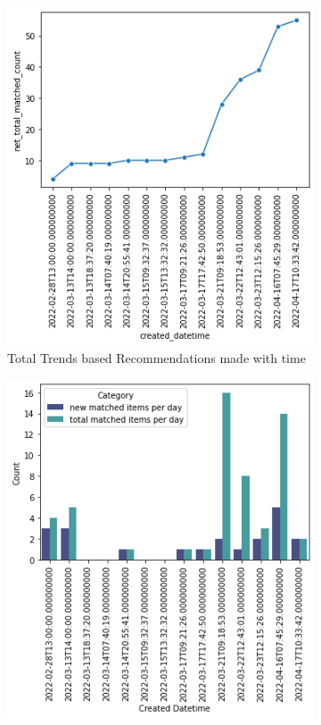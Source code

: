 \documentclass[manuscript,natbib=false, anonymous]{acmart}
\begin{document}
\begin{figure}[h]
     \centering
     \begin{subfigure}[b]{0.47\linewidth}
         \centering
         \includegraphics[width=\linewidth]{images/trends-matches-eval2.png}
         \caption{Total Trends based Recommendations made with time}
         \label{fig:trends-recsys-total-matches}
     \end{subfigure}
     \hfill
     \begin{subfigure}[b]{0.47\linewidth}
         \centering
         \includegraphics[width=\linewidth]{images/trends-matches-eval1.png}

\end{subfigure}
\end{figure}
\end{document}
